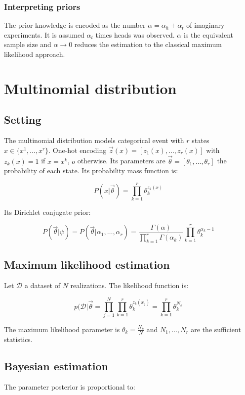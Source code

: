 		\subsubsection{Interpreting priors}
		The prior knowledge is encoded as the number $\alpha=\alpha_h+\alpha_t$ of imaginary experiments.
		It is assumed $\alpha_t$ times heads was observed.
		$\alpha$ is the equivalent sample size and $\alpha\rightarrow 0$ reduces the estimation to the classical maximum likelihood approach.

\section{Multinomial distribution}

	\subsection{Setting}
	The multinomial distribution models categorical event with $r$ states $x\in\{x^1,\dots,x^r\}$.
	One-hot encoding $\vec{z}(x) = [z_1(x), \dots, z_r(x)]$ with $z_k(x) = 1$ if $x=x^k$, $o$ otherwise.
	Its parameters are $\vec{\theta} = [\theta_1, \dots, \theta_r]$ the probability  of each state.
	Its probability mass function is:

	$$P(x|\vec{\theta}) = \prod\limits_{k=1}^r\theta_k^{z_k(x)}$$

	Its Dirichlet conjugate prior:

	$$P(\vec{\theta}|\psi) = P(\vec{\theta}|\alpha_1, \dots, \alpha_r) = \frac{\Gamma(\alpha)}{\prod\limits_{k=1}^r\Gamma(\alpha_k)}\prod\limits_{k=1}^r\theta_k^{\alpha_k-1}$$

	\subsection{Maximum likelihood estimation}
	Let $\mathcal{D}$ a dataset of $N$ realizations.
	The likelihood function is:

	$$p(\mathcal{D}|\vec{\theta} = \prod\limits_{j=1}^N\prod\limits_{k=1}^r\theta_k^{z_k(x_j)} = \prod\limits_{k=1}^r\theta_k^{N_k}$$

	The maximum likelihood parameter is $\theta_k= \frac{N_k}{N}$ and $N_1, \dots, N_r$ are the sufficient statistics.

	\subsection{Bayesian estimation}
	The parameter posterior is proportional to:

